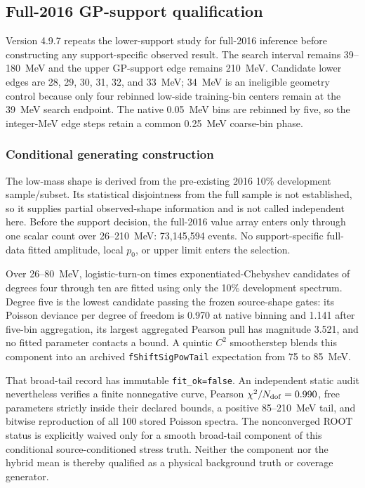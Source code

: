 \subsection{Full-2016 GP-support qualification}
\label{sec:v4p9p7-2016-support}

Version 4.9.7 repeats the lower-support study for full-2016 inference before
constructing any support-specific observed result.  The search interval remains
39--180~MeV and the upper GP-support edge remains 210~MeV.  Candidate lower edges
are 28, 29, 30, 31, 32, and 33~MeV; 34~MeV is an ineligible geometry control because
only four rebinned low-side training-bin centers remain at the 39~MeV search endpoint.
The native 0.05~MeV bins are rebinned by five, so the integer-MeV edge steps retain a
common 0.25~MeV coarse-bin phase.

\subsubsection{Conditional generating construction}

The low-mass shape is derived from the pre-existing 2016 10\% development
sample/subset.  Its statistical disjointness from the full sample is not established,
so it supplies partial observed-shape information and is not called independent here.
Before the support decision, the full-2016 value array enters only through one scalar
count over 26--210~MeV: 73,145,594 events.  No support-specific full-data fitted
amplitude, local $p_0$, or upper limit enters the selection.

Over 26--80~MeV, logistic-turn-on times exponentiated-Chebyshev candidates of degrees
four through ten are fitted using only the 10\% development spectrum.  Degree five is
the lowest candidate passing the frozen source-shape gates: its Poisson deviance per
degree of freedom is 0.970 at native binning and 1.141 after five-bin aggregation, its
largest aggregated Pearson pull has magnitude 3.521, and no fitted parameter contacts
a bound.  A quintic $C^2$ smootherstep blends this component into an archived
\texttt{fShiftSigPowTail} expectation from 75 to 85~MeV.

That broad-tail record has immutable \texttt{fit\_ok=false}.  An independent static
audit nevertheless verifies a finite nonnegative curve, Pearson
$\chi^2/N_{\rm dof}=0.990$, free parameters strictly inside their declared bounds, a
positive 85--210~MeV tail, and bitwise reproduction of all 100 stored Poisson spectra.
The nonconverged ROOT status is explicitly waived only for a smooth broad-tail
component of this conditional source-conditioned stress truth.  Neither the component
nor the hybrid mean is thereby qualified as a physical background truth or coverage
generator.

